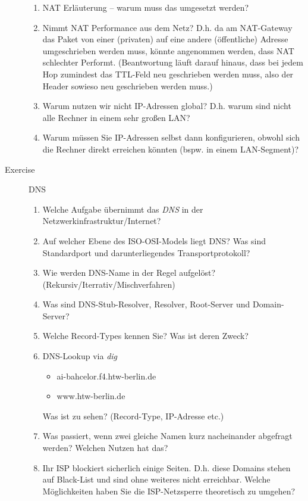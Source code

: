 \documentclass[a4paper,twoside,12pt]{article}
\newcounter{AUFGNR}
\newcommand{\AUFGABE}[2]{\vspace{0.3cm}\item[Exercise \arabic{AUFGNR}]\stepcounter{AUFGNR} #1\hfill\emph{#2}}
\begin{document}
\begin{description}
\begin{enumerate}
	\item NAT Erläuterung -- warum muss das umgesetzt werden?
	\item Nimmt NAT Performance aus dem Netz? D.h. da am NAT-Gateway das Paket von einer (privaten) auf eine andere (öffentliche) Adresse umgeschrieben werden muss, könnte angenommen werden, dass NAT schlechter Performt. (Beantwortung läuft darauf hinaus, dass bei jedem Hop zumindest das TTL-Feld neu geschrieben werden muss, also der Header sowieso neu geschrieben werden muss.)
	\item Warum nutzen wir nicht IP-Adressen global? D.h. warum sind nicht alle Rechner in einem sehr großen LAN?
	\item Warum müssen Sie IP-Adressen selbst dann konfigurieren, obwohl sich die Rechner direkt erreichen könnten (bspw. in einem LAN-Segment)?
\end{enumerate}

\AUFGABE{DNS}{}

\begin{enumerate}
	\item Welche Aufgabe übernimmt das \emph{DNS} in der Netzwerkinfrastruktur/Internet?
	\item Auf welcher Ebene des ISO-OSI-Models liegt DNS? Was sind Standardport und darunterliegendes Transportprotokoll?
	\item Wie werden DNS-Name in der Regel aufgelöst? (Rekursiv/Iterrativ/Mischverfahren)
	\item Was sind DNS-Stub-Resolver, Resolver, Root-Server und Domain-Server?
	\item Welche Record-Types kennen Sie? Was ist deren Zweck?
	\item DNS-Lookup via \emph{dig}
	\begin{itemize}
		\item ai-bahcelor.f4.htw-berlin.de
		\item www.htw-berlin.de
	\end{itemize}
	Was ist zu sehen? (Record-Type, IP-Adresse etc.)
	\item Was passiert, wenn zwei gleiche Namen kurz nacheinander abgefragt werden? Welchen Nutzen hat das?
	\item Ihr ISP blockiert sicherlich einige Seiten. D.h. diese Domains stehen auf Black-List und sind ohne weiteres nicht erreichbar. Welche Möglichkeiten haben Sie die ISP-Netzsperre theoretisch zu umgehen?
\end{enumerate}


\end{description}
\end{document}
